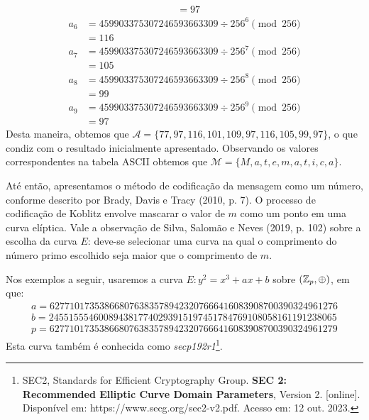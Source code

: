\begin{exemplo}
\begin{align}
		    & = 97 \nonumber
	\end{align}
	\begin{align}
		a_6 & = 459903375307246593663309 \div 256^{6} \pmod {256}  \nonumber \\
		    & = 116 \nonumber
	\end{align}
	\begin{align}
		a_7 & = 459903375307246593663309 \div 256^{7} \pmod {256}  \nonumber \\
		    & = 105 \nonumber
	\end{align}
	\begin{align}
		a_8 & = 459903375307246593663309 \div 256^{8} \pmod {256}  \nonumber \\
		    & = 99 \nonumber
	\end{align}
	\begin{align}
		a_9 & = 459903375307246593663309 \div 256^{9} \pmod {256}  \nonumber \\
		    & = 97 \nonumber
	\end{align}
	Desta maneira, obtemos que  $\mathcal{A} = \{ 77, 97, 116, 101, 109, 97, 116, 105, 99, 97\} $, o que condiz com o resultado inicialmente apresentado. Observando os valores correspondentes na tabela ASCII obtemos que $\mathcal{M} = \{M, a, t, e, m, a, t, i, c, a\} $.
\end{exemplo}

Até então, apresentamos o método de codificação da mensagem como um número,
conforme descrito por Brady, Davis e Tracy (2010, p. 7). O processo de
codificação de Koblitz envolve mascarar o valor de $m$ como um ponto em uma
curva elíptica. Vale a observação de Silva, Salomão e Neves (2019, p. 102)
sobre a escolha da curva $E$: deve-se selecionar uma curva na qual o
comprimento do número primo escolhido seja maior que o comprimento de $m$.

Nos exemplos a seguir, usaremos a curva $E: y^2 = x^3 + ax + b$ sobre $(\mathbb{Z}_p,
	\oplus)$, em que:
\begin{align}
	a = 6277101735386680763835789423207666416083908700390324961276 \nonumber \\
	b = 2455155546008943817740293915197451784769108058161191238065 \nonumber \\
	p = 6277101735386680763835789423207666416083908700390324961279 \nonumber
\end{align}
Esta curva também é conhecida como \textit{secp192r1}\footnote{SEC2, Standards for Efficient Cryptography Group.\textbf{ SEC 2: Recommended Elliptic Curve Domain Parameters}, Version 2. [online]. Disponível em: https://www.secg.org/sec2-v2.pdf. Acesso em:
	12 out. 2023.}.

